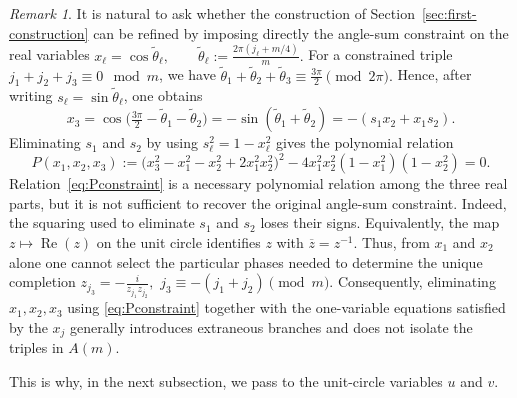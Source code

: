 \documentclass[11pt,reqno]{amsart}
\theoremstyle{remark}
\newtheorem{remark}[theorem]{Remark}
\begin{document}
\begin{remark}\rm
\label{rem:real_variable_limit}
It is natural to ask whether the construction of
Section~\ref{sec:first-construction} can be refined by imposing directly the
angle-sum constraint on the real variables $
 x_\ell=\cos\widetilde\theta_\ell,
 \qquad
 \widetilde\theta_\ell:=\frac{2\pi(j_\ell+m/4)}{m}.
$
For a constrained triple $j_1+j_2+j_3\equiv0\mod m$, we have
$
 \widetilde\theta_1+\widetilde\theta_2+\widetilde\theta_3
 \equiv \frac{3\pi}{2}\pmod{2\pi}.
$
Hence, after writing $s_\ell=\sin\widetilde\theta_\ell$, one obtains
\[
 x_3
 =\cos\bigl(\tfrac{3\pi}{2}-\widetilde\theta_1-
 \widetilde\theta_2\bigr)
 =-\sin(\widetilde\theta_1+\widetilde\theta_2)
 =-(s_1x_2+x_1s_2).
\]
Eliminating $s_1$ and $s_2$ by using $s_\ell^2=1-x_\ell^2$ gives the
polynomial relation
\begin{equation}
\label{eq:Pconstraint}
 P(x_1,x_2,x_3):={\bigl(x_3^2-x_1^2-x_2^2+2x_1^2x_2^2\bigr)^2}
   -4x_1^2x_2^2(1-x_1^2)(1-x_2^2)=0.
\end{equation}
Relation~\eqref{eq:Pconstraint} is a necessary polynomial relation among
the three real parts, but it is not sufficient to recover the original
angle-sum constraint.  Indeed, the squaring used to eliminate $s_1$ and
$s_2$ loses their signs.  Equivalently, the map
$z\mapsto\operatorname{Re}(z)$ on the unit circle identifies $z$ with
$\overline z=z^{-1}$.  Thus, from $x_1$ and $x_2$ alone one cannot select
the particular phases needed to determine the unique completion
$ z_{j_3}=-\frac{i}{z_{j_1}z_{j_2}},$  $j_3\equiv-(j_1+j_2)\pmod m.$
Consequently, eliminating $x_1,x_2,x_3$ using
\eqref{eq:Pconstraint} together with the one-variable equations satisfied
by the $x_j$ generally introduces extraneous branches and does not isolate
the triples in $A(m)$.

This is why, in the next subsection, we pass to the unit-circle variables
$u$ and $v$.
\end{remark}
\end{document}
